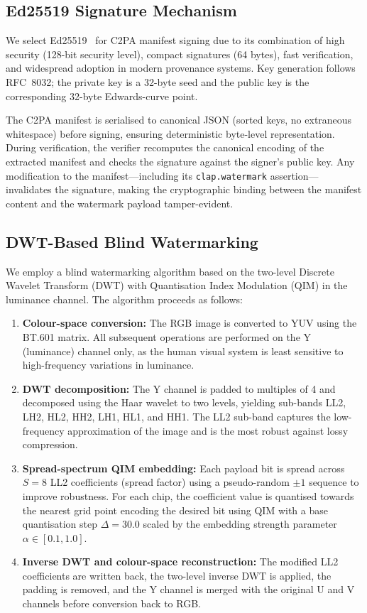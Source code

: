 \documentclass[conference]{IEEEtran}
\begin{document}
\subsection{Ed25519 Signature Mechanism}

We select Ed25519~\cite{bernstein2012ed25519} for C2PA manifest signing
due to its combination of high security (128-bit security level), compact
signatures (64 bytes), fast verification, and widespread adoption in
modern provenance systems.
Key generation follows RFC~8032; the private key is a 32-byte seed and
the public key is the corresponding 32-byte Edwards-curve point.

The C2PA manifest is serialised to canonical JSON (sorted keys, no
extraneous whitespace) before signing, ensuring deterministic byte-level
representation.
During verification, the verifier recomputes the canonical encoding
of the extracted manifest and checks the signature against the signer's
public key.
Any modification to the manifest—including its \texttt{clap.watermark}
assertion—invalidates the signature, making the cryptographic binding
between the manifest content and the watermark payload tamper-evident.

\subsection{DWT-Based Blind Watermarking}

We employ a blind watermarking algorithm based on the two-level Discrete
Wavelet Transform (DWT) with Quantisation Index Modulation (QIM) in the
luminance channel.
The algorithm proceeds as follows:

\begin{enumerate}
    \item \textbf{Colour-space conversion:} The RGB image is converted to
    YUV using the BT.601 matrix.  All subsequent operations are performed
    on the Y (luminance) channel only, as the human visual system is
    least sensitive to high-frequency variations in luminance.
    \item \textbf{DWT decomposition:} The Y channel is padded to multiples
    of 4 and decomposed using the Haar wavelet to two levels, yielding
    sub-bands LL2, LH2, HL2, HH2, LH1, HL1, and HH1.
    The LL2 sub-band captures the low-frequency approximation of the image
    and is the most robust against lossy compression.
    \item \textbf{Spread-spectrum QIM embedding:} Each payload bit is
    spread across $S = 8$ LL2 coefficients (spread factor) using a
    pseudo-random $\pm1$ sequence to improve robustness.  For each chip,
    the coefficient value is quantised towards the nearest grid point
    encoding the desired bit using QIM with a base quantisation step
    $\Delta = 30.0$ scaled by the embedding strength parameter
    $\alpha \in [0.1, 1.0]$.
    \item \textbf{Inverse DWT and colour-space reconstruction:} The
    modified LL2 coefficients are written back, the two-level inverse DWT
    is applied, the padding is removed, and the Y channel is merged with
    the original U and V channels before conversion back to RGB.
\end{enumerate}
\end{document}
